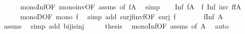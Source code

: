 \begin{isabellebody}
\ \ \ \ \isamarkupfalse%
\ mono{\isacharunderscore}{\kern0pt}Inf{\isacharbrackleft}{\kern0pt}OF\ mono{\isacharunderscore}{\kern0pt}inv{\isacharbrackleft}{\kern0pt}OF\ assms{\isacharbrackright}{\kern0pt}{\isacharcomma}{\kern0pt}\ of\ {\isachardoublequoteopen}f{\isacharbackquote}{\kern0pt}A{\isachardoublequoteclose}{\isacharbrackright}{\kern0pt}\ \isamarkupfalse%
\ simp\isanewline
\ \ \isamarkupfalse%
\ {\isachardoublequoteopen}Inf\ {\isacharparenleft}{\kern0pt}f{\isacharbackquote}{\kern0pt}A{\isacharparenright}{\kern0pt}\ {\isasymle}\ f\ {\isacharparenleft}{\kern0pt}Inf\ {\isacharparenleft}{\kern0pt}{\isacharparenleft}{\kern0pt}inv\ f{\isacharparenright}{\kern0pt}{\isacharbackquote}{\kern0pt}{\isacharparenleft}{\kern0pt}f{\isacharbackquote}{\kern0pt}A{\isacharparenright}{\kern0pt}{\isacharparenright}{\kern0pt}{\isacharparenright}{\kern0pt}{\isachardoublequoteclose}\isanewline
\ \ \ \ \isamarkupfalse%
\ monoD{\isacharbrackleft}{\kern0pt}OF\ {\isacartoucheopen}mono\ f{\isacartoucheclose}\ {\isacharasterisk}{\kern0pt}{\isacharbrackright}{\kern0pt}\ \isamarkupfalse%
{\isacharparenleft}{\kern0pt}simp\ add{\isacharcolon}{\kern0pt}\ surj{\isacharunderscore}{\kern0pt}f{\isacharunderscore}{\kern0pt}inv{\isacharunderscore}{\kern0pt}f{\isacharbrackleft}{\kern0pt}OF\ {\isacartoucheopen}surj\ f{\isacartoucheclose}{\isacharbrackright}{\kern0pt}{\isacharparenright}{\kern0pt}\isanewline
\ \ \isamarkupfalse%
\ \isamarkupfalse%
\ {\isachardoublequoteopen}{\isachardot}{\kern0pt}{\isachardot}{\kern0pt}{\isachardot}{\kern0pt}\ {\isacharequal}{\kern0pt}\ f{\isacharparenleft}{\kern0pt}Inf\ A{\isacharparenright}{\kern0pt}{\isachardoublequoteclose}\isanewline
\ \ \ \ \isamarkupfalse%
\ assms\ \isamarkupfalse%
\ {\isacharparenleft}{\kern0pt}simp\ add{\isacharcolon}{\kern0pt}\ bij{\isacharunderscore}{\kern0pt}is{\isacharunderscore}{\kern0pt}inj{\isacharparenright}{\kern0pt}\isanewline
\ \ \isamarkupfalse%
\ \isamarkupfalse%
\ {\isacharquery}{\kern0pt}thesis\ \isamarkupfalse%
\ mono{\isacharunderscore}{\kern0pt}Inf{\isacharbrackleft}{\kern0pt}OF\ assms{\isacharparenleft}{\kern0pt}{}{\isacharparenright}{\kern0pt}{\isacharcomma}{\kern0pt}\ of\ A{\isacharbrackright}{\kern0pt}\ \isamarkupfalse%
\ auto\isanewline
{}\isamarkupfalse%
%
\endisatagproof
{\isafoldproof}%
%
\isadelimproof
\isanewline
%
\endisadelimproof
\isanewline
{}\isamarkupfalse%

\end{isabellebody}
